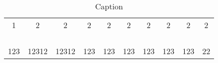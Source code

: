 \begin{table}[h]
    \centering
     \caption{Caption}
    \begin{tabular}{cccccccccc}
        1 & 2 & 2 & 2 & 2 & 2 & 2 & 2 & 2 & 2\\
         &  &  &  &  &  &  &  &  & \\
         &  &  &  &  &  &  &  &  & \\
         &  &  &  &  &  &  &  &  & \\
         &  &  &  &  &  &  &  &  & \\
       123  &12312  & 12312 & 123 & 123 & 123 &123  & 123 & 123 &22 \\
    \end{tabular}
   
    \label{tab:my_label}
\end{table}